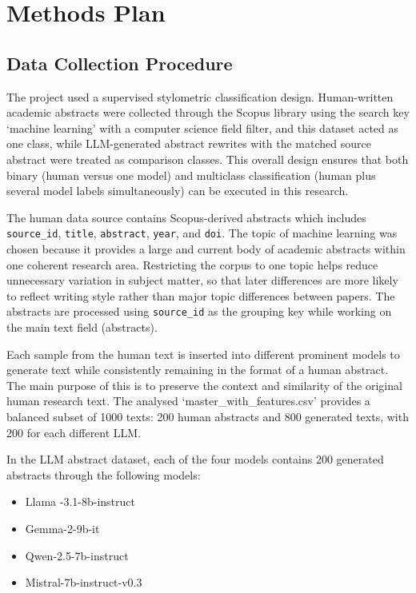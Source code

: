 \documentclass[12pt,a4paper]{article}
\begin{document}
\section{Methods Plan}

\subsection{Data Collection Procedure}

The project used a supervised stylometric classification design. Human-written academic abstracts were collected through the Scopus library using the search key `machine learning' with a computer science field filter, and this dataset acted as one class, while LLM-generated abstract rewrites with the matched source abstract were treated as comparison classes. This overall design ensures that both binary (human versus one model) and multiclass classification (human plus several model labels simultaneously) can be executed in this research.

The human data source contains Scopus-derived abstracts which includes \texttt{source\_id}, \texttt{title}, \texttt{abstract}, \texttt{year}, and \texttt{doi}. The topic of machine learning was chosen because it provides a large and current body of academic abstracts within one coherent research area. Restricting the corpus to one topic helps reduce unnecessary variation in subject matter, so that later differences are more likely to reflect writing style rather than major topic differences between papers. The abstracts are processed using \texttt{source\_id} as the grouping key while working on the main text field (abstracts).

Each sample from the human text is inserted into different prominent models to generate text while consistently remaining in the format of a human abstract. The main purpose of this is to preserve the context and similarity of the original human research text. The analysed `master\_with\_features.csv' provides a balanced subset of 1000 texts: 200 human abstracts and 800 generated texts, with 200 for each different LLM.

In the LLM abstract dataset, each of the four models contains 200 generated abstracts through the following models:

\begin{itemize}
    \item Llama -3.1-8b-instruct
    \item Gemma-2-9b-it
    \item Qwen-2.5-7b-instruct
    \item Mistral-7b-instruct-v0.3
\end{itemize}
\end{document}
